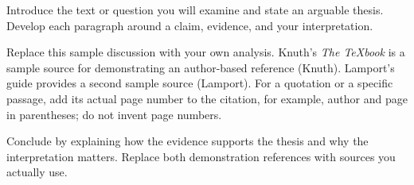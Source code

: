 Introduce the text or question you will examine and state an arguable thesis.
Develop each paragraph around a claim, evidence, and your interpretation.

Replace this sample discussion with your own analysis. Knuth's \textit{The
TeXbook} is a sample source for demonstrating an author-based reference
(Knuth). Lamport's guide provides a second sample source (Lamport). For a
quotation or a specific passage, add its actual page number to the citation,
for example, author and page in parentheses; do not invent page numbers.

Conclude by explaining how the evidence supports the thesis and why the
interpretation matters. Replace both demonstration references with sources
you actually use.

